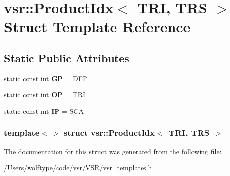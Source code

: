 \hypertarget{structvsr_1_1_product_idx_3_01_t_r_i_00_01_t_r_s_01_4}{\section{vsr\-:\-:Product\-Idx$<$ T\-R\-I, T\-R\-S $>$ Struct Template Reference}
\label{structvsr_1_1_product_idx_3_01_t_r_i_00_01_t_r_s_01_4}
}
\subsection*{Static Public Attributes}
\begin{DoxyCompactItemize}
\item 
\hypertarget{structvsr_1_1_product_idx_3_01_t_r_i_00_01_t_r_s_01_4_a3425e218cd2da05e12b368092084579d}{static const int {\bfseries G\-P} = D\-F\-P}\label{structvsr_1_1_product_idx_3_01_t_r_i_00_01_t_r_s_01_4_a3425e218cd2da05e12b368092084579d}

\item 
\hypertarget{structvsr_1_1_product_idx_3_01_t_r_i_00_01_t_r_s_01_4_a55be38bf7fce5be2d8fde9219d555bfe}{static const int {\bfseries O\-P} = T\-R\-I}\label{structvsr_1_1_product_idx_3_01_t_r_i_00_01_t_r_s_01_4_a55be38bf7fce5be2d8fde9219d555bfe}

\item 
\hypertarget{structvsr_1_1_product_idx_3_01_t_r_i_00_01_t_r_s_01_4_a76a79e7451e63284f6dae6c95be3cdf3}{static const int {\bfseries I\-P} = S\-C\-A}\label{structvsr_1_1_product_idx_3_01_t_r_i_00_01_t_r_s_01_4_a76a79e7451e63284f6dae6c95be3cdf3}

\end{DoxyCompactItemize}
\subsubsection*{template$<$$>$ struct vsr\-::\-Product\-Idx$<$ T\-R\-I, T\-R\-S $>$}



The documentation for this struct was generated from the following file\-:\begin{DoxyCompactItemize}
\item 
/\-Users/wolftype/code/vsr/\-V\-S\-R/vsr\-\_\-templates.\-h\end{DoxyCompactItemize}
